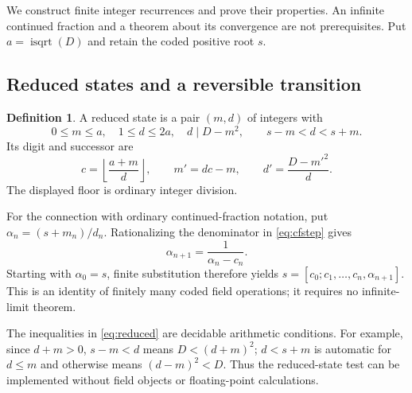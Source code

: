 \documentclass[11pt,letterpaper]{article}
\theoremstyle{definition}
\newtheorem{definition}[theorem]{Definition}
\newcommand{\isqrt}{\operatorname{isqrt}}
\begin{document}
We construct finite integer recurrences and prove their properties. An
infinite continued fraction and a theorem about its convergence are not
prerequisites. Put $a=\isqrt(D)$ and retain the coded positive root $s$.

\subsection{Reduced states and a reversible transition}

\begin{definition}
A reduced state is a pair $(m,d)$ of integers with
\begin{equation}\label{eq:reduced}
 0\le m\le a,\quad 1\le d\le2a,\quad d\mid D-m^2,
 \qquad s-m<d<s+m.
\end{equation}
Its digit and successor are
\begin{equation}\label{eq:cfstep}
 c=\left\lfloor\frac{a+m}{d}\right\rfloor,
 \qquad m'=dc-m,
 \qquad d'=\frac{D-m'^2}{d}.
\end{equation}
The displayed floor is ordinary integer division.
\end{definition}

For the connection with ordinary continued-fraction notation, put
$\alpha_n=(s+m_n)/d_n$. Rationalizing the denominator in
\eqref{eq:cfstep} gives
\[
 \alpha_{n+1}=\frac1{\alpha_n-c_n}.
\]
Starting with $\alpha_0=s$, finite substitution therefore yields
$s=[c_0;c_1,\ldots,c_n,\alpha_{n+1}]$. This is an identity of finitely
many coded field operations; it requires no infinite-limit theorem.

The inequalities in \eqref{eq:reduced} are decidable arithmetic conditions.
For example, since $d+m>0$, $s-m<d$ means $D<(d+m)^2$;
$d<s+m$ is automatic for $d\le m$ and otherwise means
$(d-m)^2<D$. Thus the reduced-state test can be implemented without field
objects or floating-point calculations.
\end{document}
